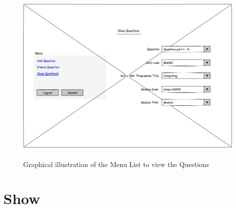 \begin{figure}[htbp]
\center \includegraphics[width=400pt]{Figures/Show_Questions}\\
\caption{Graphical illustration of the Menu List to view the Questions} \label{Figure: Graphical illustration of the Menu List to view the Questions}
\end{figure}

\newpage

\section{Show}
\label{Appendix: Ticket 1 -- 730-243}


